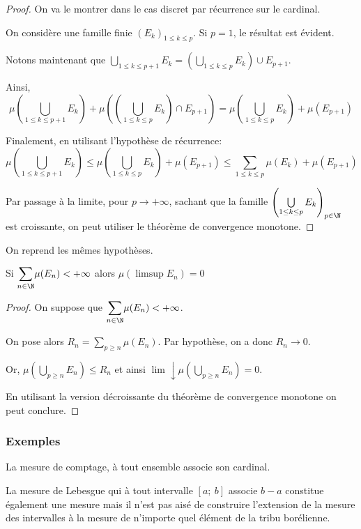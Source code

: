 \begin{proof}
On va le montrer dans le cas discret par récurrence sur le cardinal. 

On considère une famille finie $(E_k)_{1 \leq k \leq p}$. Si $p=1$, le résultat est évident.

Notons maintenant que $\bigcup \limits_{1 \leq k \leq p+1} E_k = \left( \bigcup \limits_{1 \leq k \leq p} E_k \right) \cup E_{p+1}$.

Ainsi,
\[
\mu\left( \bigcup \limits_{1 \leq k \leq p+1} E_k \right) + \mu\left( \left( \bigcup \limits_{1 \leq k \leq p} E_k \right) \cap E_{p+1}  \right) = \mu\left( \bigcup \limits_{1 \leq k \leq p} E_k \right) + \mu(E_{p+1}) 
\]

Finalement, en utilisant l'hypothèse de récurrence:
\[
\mu\left( \bigcup \limits_{1 \leq k \leq p+1} E_k \right) \leq \mu\left( \bigcup \limits_{1 \leq k \leq p} E_k \right) + \mu(E_{p+1}) \leq \displaystyle{\sum \limits_{1 \leq k \leq p}} \mu(E_k) + \mu(E_{p+1})
\]

Par passage à la limite, pour $p \to +\infty$, sachant que la famille $\left( \bigcup \limits_{1 \leq k \leq p} E_k\right)_{p \in \N}$ est croissante, on peut utiliser le théorème de convergence monotone.
\end{proof}

\begin{prop}
On reprend les mêmes hypothèses.

Si $\displaystyle{\sum \limits_{n \in \N}} \mu(E_n)<+\infty$ alors $\mu\left(\limsup E_n\right) = 0$
\end{prop}

\begin{proof}
On suppose que $\displaystyle{\sum \limits_{n \in \N}} \mu(E_n)<+\infty$. 

On pose alors $R_n = \displaystyle{\sum \limits_{p \geq n}} \mu(E_n)$. Par hypothèse, on a donc $R_n \to 0$.

Or, $\mu\left(\bigcup \limits_{p \geq n} E_n\right) \leq R_n$ et ainsi $\lim \downarrow \mu\left(\bigcup \limits_{p \geq n} E_n\right) = 0$.

En utilisant la version décroissante du théorème de convergence monotone on peut conclure.
\end{proof}

\subsubsection{Exemples}

La mesure de comptage, à tout ensemble associe son cardinal.

La mesure de Lebesgue qui à tout intervalle $[a;~b]$ associe $b-a$ constitue également une mesure mais il n'est pas aisé de construire l'extension de la mesure des intervalles à la mesure de n'importe quel élément de la tribu borélienne.

%
%